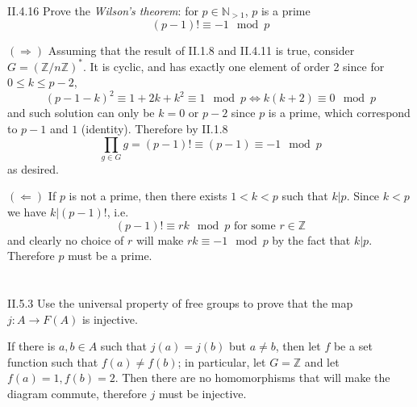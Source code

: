 \begin{problem}{II.4.16}
Prove the \textit{Wilson's theorem}: for $p \in \mathbb{N}_{>1}$, $p$ is a prime \iffw
\[
(p-1)! \equiv -1 \mod p
\]
\end{problem}
\begin{pf}
$(\Rightarrow)$ Assuming that the result of II.1.8 and II.4.11 is true, consider $G = (\mathbb{Z}/n\mathbb{Z})^*$. It is cyclic, and has exactly one element of order 2 since for $0 \leq k \leq p - 2$,
\[
(p-1-k)^2 \equiv 1 + 2k + k^2 \equiv 1 \mod p \iff k(k+2) \equiv 0 \mod p 
\]
and such solution can only be $k = 0 \text { or } p-2$ since $p$ is a prime, which correspond to $p-1$ and $1$ (identity). Therefore by II.1.8
\[
\prod_{g \in G} g = (p-1)! \equiv (p-1) \equiv -1 \mod p
\]
as desired.

\noindent $(\Leftarrow)$ If $p$ is not a prime, then there exists $1 < k < p$ such that $k|p$. Since $k < p$ we have $k | (p-1)!$, i.e. 
\[
(p-1)! \equiv rk \mod p \text{ for some } r \in \mathbb{Z}
\]
and clearly no choice of $r$ will make $rk \equiv -1 \mod p$ by the fact that $k|p$. Therefore $p$ must be a prime.
\end{pf}

\section{}

\begin{problem}{II.5.3}
Use the universal property of free groups to prove that the map $j:A \to F(A)$ is injective.
\end{problem}
\begin{pf}
If there is $a,b \in A$ such that $j(a) = j(b)$ but $a \neq b$, then let $f$ be a set function such that $f(a) \neq f(b)$; in particular, let $G = \mathbb{Z}$ and let $f(a) = 1, f(b) = 2$. Then there are no homomorphisms that will make the diagram commute, therefore $j$ must be injective. 
\end{pf}

